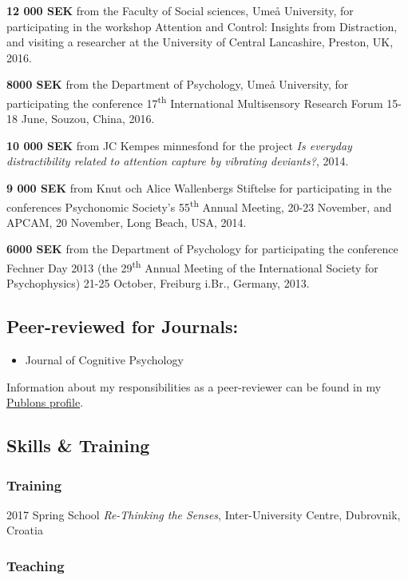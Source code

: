 \documentclass[]{article}
\providecommand{\tightlist}{%
  \setlength{\itemsep}{0pt}\setlength{\parskip}{0pt}}
\begin{document}
\textbf{12 000 SEK} from the Faculty of Social sciences, Umeå
University, for participating in the workshop Attention and Control:
Insights from Distraction, and visiting a researcher at the University
of Central Lancashire, Preston, UK, 2016.

\textbf{8000 SEK} from the Department of Psychology, Umeå University,
for participating the conference 17\textsuperscript{th} International
Multisensory Research Forum 15-18 June, Souzou, China, 2016.

\textbf{10 000 SEK} from JC Kempes minnesfond for the project \emph{Is
everyday distractibility related to attention capture by vibrating
deviants?}, 2014.

\textbf{9 000 SEK} from Knut och Alice Wallenbergs Stiftelse for
participating in the conferences Psychonomic Society's
55\textsuperscript{th} Annual Meeting, 20-23 November, and APCAM, 20
November, Long Beach, USA, 2014.

\textbf{6000 SEK} from the Department of Psychology for participating
the conference Fechner Day 2013 (the 29\textsuperscript{th} Annual
Meeting of the International Society for Psychophysics) 21-25 October,
Freiburg i.Br., Germany, 2013.

\subsection{Peer-reviewed for
Journals:}\label{peer-reviewed-for-journals}

\begin{itemize}
\tightlist
\item
  Journal of Cognitive Psychology
\end{itemize}

Information about my responsibilities as a peer-reviewer can be found in
my \href{https://www.publons.com/a/1517052/}{Publons profile}.

\subsection{Skills \& Training}\label{skills-training}

\subsubsection{Training}\label{training}

2017 Spring School \emph{Re-Thinking the Senses}, Inter-University
Centre, Dubrovnik, Croatia

\subsubsection{Teaching}\label{teaching}
\end{document}
